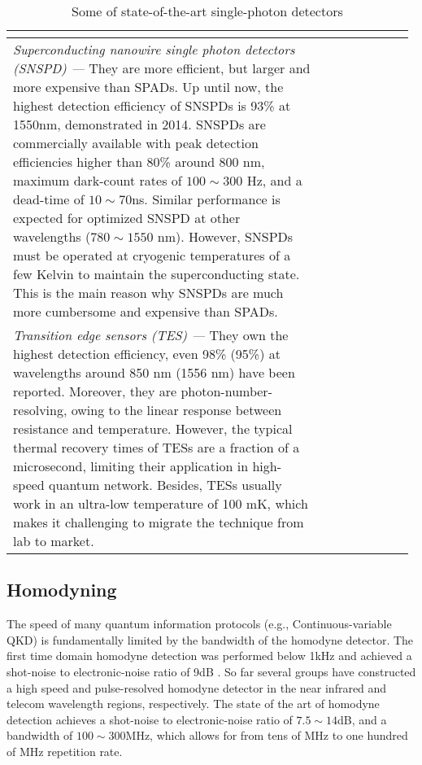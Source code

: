\begin{table*}[!htbp]
\begin{tabular}{|p{0.755\linewidth}|p{0.22\linewidth}|}
\begin{itemize}
		\end{itemize} &  \cite{bib:shentu2013ultralow} \\
		\hline
		{\em Superconducting nanowire single photon detectors (SNSPD) ---} 
		They are more efficient, but larger and more expensive than SPADs. Up until now, the highest detection efficiency of SNSPDs is 93\% at 1550nm, demonstrated in 2014. SNSPDs are commercially available with peak detection efficiencies higher than 80\% around 800 nm, maximum dark-count rates of $100\sim 300$ Hz, and a dead-time of $10\sim 70$ns. Similar performance is expected for optimized SNSPD at other wavelengths ($780\sim 1550$ nm). However, SNSPDs must be operated at cryogenic temperatures of a few Kelvin to maintain the superconducting state. This is the main reason why SNSPDs are much more cumbersome and expensive than SPADs. &  \cite{bib:marsili2013} \\
		\hline
		{\em Transition edge sensors (TES) ---}
		They own the highest detection efficiency, even 98\% (95\%) at wavelengths around 850 nm (1556 nm) have been reported. Moreover, they are photon-number-resolving, owing to the linear response between resistance and temperature. However, the typical thermal recovery times of TESs are a fraction of a microsecond, limiting their application in high-speed quantum network. Besides, TESs usually work in an ultra-low temperature of 100 mK, which makes it challenging to migrate the technique from lab to market. & \cite{bib:fukuda2011, bib:lita2008} \\
		\hline
	\end{tabular}
	\captionspacetab \caption{Some of state-of-the-art single-photon detectors} \label{tab:photodetection}
\end{table*}

%
%

\subsection{Homodyning} 

The speed of many quantum information protocols (e.g., Continuous-variable QKD) is fundamentally limited by the bandwidth of the homodyne detector. The first time domain homodyne detection was performed below 1kHz and achieved a shot-noise to electronic-noise ratio of 9dB \cite{bib:winzer2010}. So far several groups \cite{bib:zavatta2002time, bib:okubo2008pulse, bib:kumar2012versatile, bib:chi2011balanced, bib:duan2013} have constructed a high speed and pulse-resolved homodyne detector in the near infrared and telecom wavelength regions, respectively. The state of the art of homodyne detection achieves a shot-noise to electronic-noise ratio of \mbox{$7.5\sim 14$dB}, and a bandwidth of \mbox{$100\sim 300$MHz}, which allows for from tens of MHz to one hundred of MHz repetition rate.

